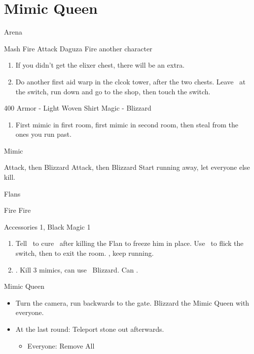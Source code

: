 \chapter{Mimic Queen}


\begin{battle}{Arena}
\begin{itemize}
\vaanf Mash Fire
\balthierf Attack Daguza
\vaanf Fire another character
\end{itemize}
\end{battle}
\begin{enumerate}
\item If you didn't get the elixer chest, there will be an extra.
\item Do another first aid warp in the clcok tower, after the two chests. Leave \balthier\ at the switch, run down and go to the shop, then touch the switch.
\end{enumerate}
\begin{shop}{400}
	Armor - Light Woven Shirt
	Magic - Blizzard
\end{shop}
\begin{enumerate}
\item First mimic in first room, first mimic in second room, then steal from the ones you run past.
\end{enumerate}
\begin{battle}{Mimic}
\begin{itemize}
\franf Attack, then Blizzard
\vaanf Attack, then Blizzard
\franf Start running away, let everyone else kill.
\end{itemize}
\end{battle}
\begin{battle}{Flans}
\begin{itemize}
\franf Fire
\vaanf Fire
\end{itemize}
\end{battle}
\begin{liscense}
\begin{itemize}
\balthierf Accessories 1, Black Magic 1
\end{itemize}
\end{liscense}
\begin{enumerate}
\item Tell \balthier\ to cure \vaan\ after killing the Flan to freeze him in place. Use \vaan\ to flick the switch, then \leader{\balthier} to exit the room. \leader{\fran}, keep running.
\item {}. Kill 3 mimics, can use \balthier\ Blizzard. Can . \save
\end{enumerate}
\begin{battle}{Mimic Queen}
\begin{itemize}
\item Turn the camera, run backwards to the gate. Blizzard the Mimic Queen with everyone.
\item At the last round: Teleport stone out afterwards.
\begin{equip}
\begin{itemize}
\item Everyone: Remove All
\end{itemize}
\end{equip}
\end{itemize}
\end{battle}